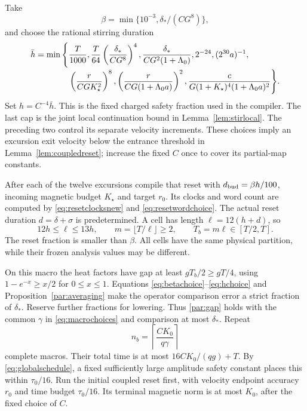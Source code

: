 \documentclass[11pt,a4paper]{amsart}
\theoremstyle{definition}
\theoremstyle{remark}
\numberwithin{equation}{section}
\begin{document}
Take
\begin{equation}\label{eq:betachoice}
 \beta=\min\{10^{-3},\delta_* /(C G^8)\},
\end{equation}
and choose the rational stirring duration
\begin{align}\label{eq:hchoice}
 \bar h=\min\Bigg\{&\frac{T}{1000},\frac{T}{64}
       \left(\frac{\delta_*}{C G^8}\right)^4,
       \frac{\delta_*}{C G^2(1+\Lambda_0)},
       2^{-24},(2^{30}a)^{-1},\notag\\[-2pt]
 &\left(\frac{r}{C G K_\star^2}\right)^8,
  \left(\frac{r}{C G(1+\Lambda_0a)}\right)^2,
  \frac{c}{G(1+K_\star)^4(1+\Lambda_0a)^2}\Bigg\}.
\end{align}
Set $h=C^{-4}\bar h$. This is the fixed charged safety fraction used in the compiler. The last cap is the joint local continuation bound in Lemma~\ref{lem:stirlocal}. The preceding two control its separate velocity increments. These choices imply an excursion exit velocity below the entrance threshold in Lemma~\ref{lem:coupledreset}; increase the fixed $C$ once to cover its partial-map constants.

After each of the twelve excursions compile that reset with
$d_{\rm bud}=\beta h/100$, incoming magnetic budget $K_\star$ and target $r_0$. Its clocks and word count are computed by \eqref{eq:resetclocksnew} and \eqref{eq:resetwordchoice}. The actual reset duration $d=\delta+\sigma$ is predetermined. A cell has length $\ell=12(h+d)$, so
\[
 12h\le\ell\le13h,\qquad
 m=\lfloor T/\ell\rfloor\ge2,\qquad T_b=m\ell\in[T/2,T].
\]
The reset fraction is smaller than $\beta$. All cells have the same physical partition, while their frozen analysis values may be different.

On this macro the heat factors have gap at least $gT_b/2\ge gT/4$, using $1-e^{-x}\ge x/2$ for $0\le x\le1$. Equations \eqref{eq:betachoice}--\eqref{eq:hchoice} and Proposition~\ref{par:averaging} make the operator comparison error a strict fraction of $\delta_*$. Reserve further fractions for lowering. Thus \eqref{par:gap} holds with the common $\gamma$ in \eqref{eq:macrochoices} and comparison at most $\delta_*$.
Repeat
\begin{equation}\label{eq:macrocount}
 n_b=\left\lceil\frac{C K_0}{q\gamma}\right\rceil
\end{equation}
complete macros. Their total time is at most $16C K_0/(qg)+T$. By \eqref{eq:globalschedule}, a fixed sufficiently large amplitude safety constant places this within $\tau_0/16$. Run the initial coupled reset first, with velocity endpoint accuracy $r_0$ and time budget $\tau_0/16$. Its terminal magnetic norm is at most $K_0$, after the fixed choice of $C$.
\end{document}
